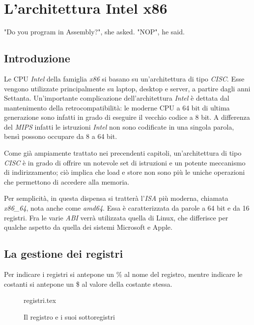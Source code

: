 \documentclass[class=book, crop=false, oneside]{standalone}
\begin{document}
\chapter{L'architettura Intel x86}\begin{fquote}[Anonymous]"Do you program in Assembly?", she asked. "NOP", he said.
 \end{fquote}

\section{Introduzione}
Le CPU \emph{Intel} della famiglia \emph{x86} si basano su un'architettura di tipo \emph{CISC}. Esse vengono utilizzate principalmente su laptop, desktop e server, a partire dagli anni Settanta. Un'importante complicazione dell'architettura \emph{Intel} è dettata dal mantenimento della retrocompatibilità: le moderne CPU a 64 bit di ultima generazione sono infatti in grado di eseguire il vecchio codice a 8 bit. A differenza del \emph{MIPS} infatti le istruzioni \emph{Intel} non sono codificate in una singola parola, bensì possono occupare da 8 a 64 bit.

Come già ampiamente trattato nei precendenti capitoli, un'architettura di tipo \emph{CISC} è in grado di offrire un notevole set di istruzioni e un potente meccanismo di indirizzamento; ciò implica che load e store non sono più le uniche operazioni che permettono di accedere alla memoria.

Per semplicità, in questa dispensa si tratterà l'\emph{ISA} più moderna, chiamata \emph{x86\_64}, nota anche come \emph{amd64}. Essa è caratterizzata da parole a 64 bit e da 16 registri. Fra le varie \emph{ABI} verrà utilizzata quella di Linux, che differisce per qualche aspetto da quella dei sistemi Microsoft e Apple.

\section{La gestione dei registri}
Per indicare i registri si antepone un \% al nome del registro, mentre indicare le costanti si antepone un \$ al valore della costante stessa.

\begin{figure}[H]
	\centering
	{registri.tex}
	\caption{Il registro  e i suoi sottoregistri}
\end{figure}
\end{document}

